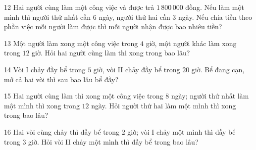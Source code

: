 \gap
\begin{probbox}{12}{\relax}
Hai người cùng làm một công việc và được trả $1\,800\,000$ đồng. Nếu làm một mình thì người thứ nhất cần $6$ ngày, người thứ hai cần $3$ ngày. Nếu chia tiền theo phần việc mỗi người làm được thì mỗi người nhận được bao nhiêu tiền?
\end{probbox}
\gap
\begin{probbox}{13}{\relax}
Một người làm xong một công việc trong $4$ giờ, một người khác làm xong trong $12$ giờ. Hỏi hai người cùng làm thì xong trong bao lâu?
\end{probbox}
\gap
\begin{probbox}{14}{\relax}
Vòi I chảy đầy bể trong $5$ giờ, vòi II chảy đầy bể trong $20$ giờ. Bể đang cạn, mở cả hai vòi thì sau bao lâu bể đầy?
\end{probbox}
\gap
\begin{probbox}{15}{\relax}
Hai người cùng làm thì xong một công việc trong $8$ ngày; người thứ nhất làm một mình thì xong trong $12$ ngày. Hỏi người thứ hai làm một mình thì xong trong bao lâu?
\end{probbox}
\gap
\begin{probbox}{16}{\relax}
Hai vòi cùng chảy thì đầy bể trong $2$ giờ; vòi I chảy một mình thì đầy bể trong $3$ giờ. Hỏi vòi II chảy một mình thì đầy bể trong bao lâu?
\end{probbox}

